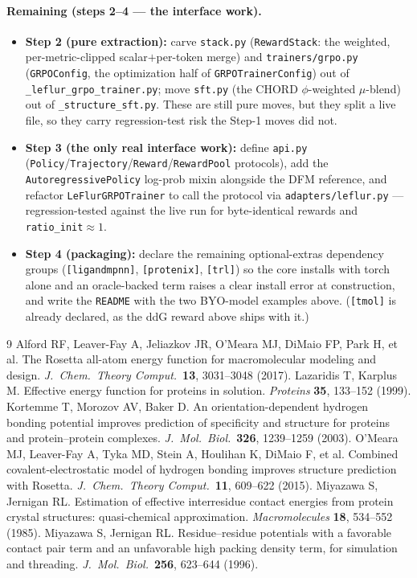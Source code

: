 \documentclass[11pt]{article}
\newcommand{\ttk}[1]{\texttt{\small #1}}
\begin{document}
\paragraph{Remaining (steps 2--4 --- the interface work).}
\begin{itemize}
\item \textbf{Step 2 (pure extraction):} carve \ttk{stack.py} (\ttk{RewardStack}: the weighted,
  per-metric-clipped scalar$+$per-token merge) and \ttk{trainers/grpo.py} (\ttk{GRPOConfig}, the
  optimization half of \ttk{GRPOTrainerConfig}) out of \ttk{\_leflur\_grpo\_trainer.py}; move
  \ttk{sft.py} (the CHORD $\phi$-weighted $\mu$-blend) out of \ttk{\_structure\_sft.py}. These are
  still pure moves, but they split a live file, so they carry regression-test risk the Step-1 moves
  did not.
\item \textbf{Step 3 (the only real interface work):} define \ttk{api.py}
  (\ttk{Policy}/\ttk{Trajectory}/\ttk{Reward}/\ttk{RewardPool} protocols), add the
  \ttk{AutoregressivePolicy} log-prob mixin alongside the DFM reference, and refactor
  \ttk{LeFlurGRPOTrainer} to call the protocol via \ttk{adapters/leflur.py} --- regression-tested
  against the live run for byte-identical rewards and \ttk{ratio\_init}$\approx1$.
\item \textbf{Step 4 (packaging):} declare the remaining optional-extras dependency groups
  (\ttk{[ligandmpnn]}, \ttk{[protenix]}, \ttk{[trl]}) so the core installs with torch alone and an
  oracle-backed term raises a clear install error at construction, and write the \ttk{README} with
  the two BYO-model examples above. (\ttk{[tmol]} is already declared, as the ddG reward above
  ships with it.)
\end{itemize}

\begin{thebibliography}{9}\small
{} Alford RF, Leaver-Fay A, Jeliazkov JR, O'Meara MJ, DiMaio FP, Park H, et al.
  The Rosetta all-atom energy function for macromolecular modeling and design.
  \emph{J.\ Chem.\ Theory Comput.}\ \textbf{13}, 3031--3048 (2017).
 Lazaridis T, Karplus M. Effective energy function for proteins in solution.
  \emph{Proteins} \textbf{35}, 133--152 (1999).
 Kortemme T, Morozov AV, Baker D. An orientation-dependent hydrogen bonding
  potential improves prediction of specificity and structure for proteins and protein--protein
  complexes. \emph{J.\ Mol.\ Biol.}\ \textbf{326}, 1239--1259 (2003).
 O'Meara MJ, Leaver-Fay A, Tyka MD, Stein A, Houlihan K, DiMaio F, et al.
  Combined covalent-electrostatic model of hydrogen bonding improves structure prediction with
  Rosetta. \emph{J.\ Chem.\ Theory Comput.}\ \textbf{11}, 609--622 (2015).
 Miyazawa S, Jernigan RL. Estimation of effective interresidue contact energies from
  protein crystal structures: quasi-chemical approximation. \emph{Macromolecules} \textbf{18},
  534--552 (1985).
 Miyazawa S, Jernigan RL. Residue--residue potentials with a favorable contact pair
  term and an unfavorable high packing density term, for simulation and threading.
  \emph{J.\ Mol.\ Biol.}\ \textbf{256}, 623--644 (1996).
\end{thebibliography}
\end{document}
